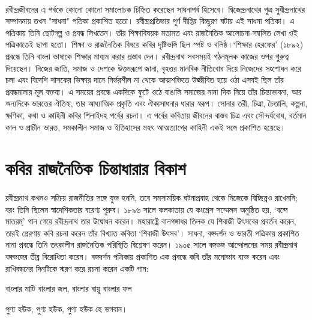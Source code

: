 \documentclass{article}
\begin{document}
\paragraph{}
রবীন্দ্রজীবনের এ পর্বকে কোনো কোনো সমালোচক চিহ্নিত করেছেন সাধনাপর্ব হিসেবে। দ্বিজেন্দ্রনাথের পুত্র সুধীন্দ্রনাথের সম্পাদনায় তখন "সাধনা" পত্রিকা প্রকাশিত হতো। রবীন্দ্রপ্রতিভার পূর্ণ দীপ্তির বিচ্ছুরণ ঘটায় এই সাধনা পত্রিকা। এ পত্রিকায় তিনি ছোটগল্প ও প্রবন্ধ লিখতেন। তাঁর শিক্ষাবিষয়ক মতামত এবং রাজনৈতিক আলোচনা-সম্বলিত লেখা ওই পত্রিকাতেই ছাপা হতো। শিক্ষা ও রাজনৈতিক বিষয়ে কবির দৃষ্টিভঙ্গি ছিল স্পষ্ট ও বলিষ্ঠ।‘শিক্ষার হেরফের’ (১৮৯২) প্রবন্ধে তিনি বাংলা ভাষাকে শিক্ষার মাধ্যম করার প্রস্তাব দেন। রবীন্দ্রনাথ সবসময়ই গঠনমূলক কাজের ওপর গুরুত্ব দিয়েছেন। নিজের জাতি, সমাজ ও দেশকে উত্তমরূপে জানা, বৃহত্তর মানবিক নীতিবোধ দিয়ে নিজেদের সংশোধন করে চলা এবং বিদেশি শাসকের ভিক্ষার দানে নির্ভরশীল না থেকে আত্মশক্তিতে উজ্জীবিত হয়ে ওঠা এসবই ছিল তাঁর প্রবন্ধমালার মূল বক্তব্য। এ সময়ের প্রবন্ধে একদিকে ফুটে ওঠে বাঙালি সমাজের নানা দিক নিয়ে তাঁর চিন্তাভাবনা, আর অন্যদিকে ভারতের ঐতিহ্য, তার আধ্যাত্মিক প্রকৃতি এবং ঐক্যসাধনার ধারার স্বরূপ। সোনার তরী, চিত্রা, চৈতালি, কল্পনা, ক্ষণিকা, কথা ও কাহিনী কবির  শিলাইদহ পর্বের রচনা। এ পর্বের কবিতায় জীবনের বাস্তব চিত্র এবং সৌন্দর্যবোধ, বর্তমান কাল ও প্রাচীন ভারত, সমকালীন সমাজ ও ইতিহাসের মহৎ আত্মত্যাগের কাহিনী একই সঙ্গে প্রকাশিত হয়েছে।

\section{কবির রাজনৈতিক চিন্তাধারার বিকাশ}
\paragraph{}
রবীন্দ্রনাথ কখনও সক্রিয় রাজনীতির সঙ্গে যুক্ত হননি, তবে সমসাময়িক ঘটনাপ্রবাহ থেকে নিজেকে বিচ্ছিন্নও রাখেননি; বরং তিনি ছিলেন স্বাদেশিকতার বরেণ্য পুরুষ। ১৮৯৬ সালে কলকাতায় যে কংগ্রেস সম্মেলন অনুষ্ঠিত হয়, ‘বন্দে মাতরম্’ গান গেয়ে রবীন্দ্রনাথ তার উদ্বোধন করেন। মহারাষ্ট্রে বালগঙ্গাধর তিলক যে শিবাজী উৎসবের প্রবর্তন করেন, তারই প্রেরণায় কবি রচনা করেন তাঁর বিখ্যাত কবিতা ‘শিবাজী উৎসব’। সাধনা, বঙ্গদর্শন ও ভারতী পত্রিকায় প্রকাশিত নানা প্রবন্ধে তিনি তৎকালীন রাজনৈতিক পরিস্থিতি বিশ্লেষণ করেন। ১৯০৫ সালে বঙ্গভঙ্গ আন্দোলনের সময় রবীন্দ্রনাথ বঙ্গভঙ্গের তীব্র বিরোধিতা করেন। বঙ্গদর্শন পত্রিকায় প্রকাশিত এক প্রবন্ধে কবি তাঁর মনোভাব ব্যক্ত করেন এবং রাখিবন্ধনের দিনটিকে স্মরণ করে রচনা করেন একটি গান:

বাংলার মাটি বাংলার জল, বাংলার বায়ু বাংলার ফল

পুণ্য হউক, পুণ্য হউক, পুণ্য হউক হে ভগবান।
\end{document}
